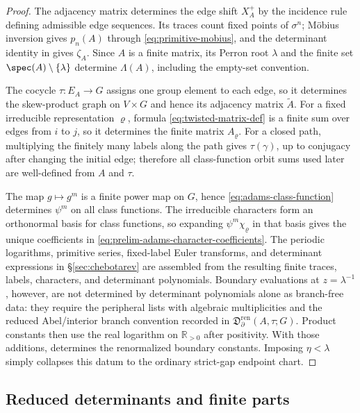 \begin{proof}
  The adjacency matrix determines the edge shift \(X_A^+\) by the
  incidence rule defining admissible edge sequences. Its traces count
  fixed points of \(\sigma^n\); M\"obius inversion gives
  \(p_n(A)\) through \eqref{eq:primitive-mobius}, and the determinant
  identity in  gives \(\zeta_A\).
  Since \(A\) is a finite matrix, its Perron root \(\lambda\) and the
  finite set \(\spec(A)\setminus\{\lambda\}\) determine
  \(\Lambda(A)\), including the empty-set convention.

  The cocycle \(\tau:E_A\to G\) assigns one group element to each edge,
  so it determines the skew-product graph on \(V\times G\) and hence its
  adjacency matrix \(\widetilde A\). For a fixed irreducible
  representation \(\varrho\), formula \eqref{eq:twisted-matrix-def}
  is a finite sum over edges from \(i\) to \(j\), so it determines the
  finite matrix \(A_\varrho\). For a closed path, multiplying the finitely
  many labels along the path gives \(\tau(\gamma)\), up to conjugacy
  after changing the initial edge; therefore all class-function orbit
  sums used later are well-defined from \(A\) and \(\tau\).

  The map \(g\mapsto g^m\) is a finite power map on \(G\), hence
  \eqref{eq:adams-class-function} determines \(\psi^m\) on all class
  functions. The irreducible characters form an orthonormal basis for
  class functions, so expanding \(\psi^m\chi_\varrho\) in that basis gives
  the unique coefficients in
  \eqref{eq:prelim-adams-character-coefficients}. The periodic
  logarithms, primitive series, fixed-label Euler transforms, and
  determinant expressions in \S\ref{sec:chebotarev} are assembled from
  the resulting finite traces, labels, characters, and determinant
  polynomials.  Boundary evaluations at \(z=\lambda^{-1}\), however, are
  not determined by determinant polynomials alone as branch-free data:
  they require the peripheral lists with algebraic multiplicities and the
  reduced Abel/interior branch convention recorded in
  \(\mathfrak D_{\partial}^{\mathrm{ren}}(A,\tau;G)\).  Product constants
  then use the real logarithm on \(\mathbb R_{>0}\) after positivity.  With those
  additions,  determines
  the renormalized boundary constants.  Imposing \(\eta<\lambda\) simply
  collapses this datum to the ordinary strict-gap endpoint chart.
\end{proof}

\subsection{Reduced determinants and finite parts}


